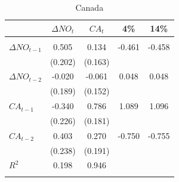 \documentclass[12pt]{article}
\begin{document}
\begin{table}[h!]
\begin{center}
\caption{Canada}			
\begin{threeparttable}

\begin{tabular}{lcccc}
&$ \Delta NO_{t} $        &$ CA_{t} $				 &4\%				&14\% \\
\hline \\[-1.8ex]

$ \Delta NO_{t - 1} $   & 0.505     & 0.134     &-0.461 	&	-0.458	  \\
				                &(0.202)    &(0.163)    &         &           \\
$ \Delta NO_{t - 2} $   &-0.020     &-0.061     & 0.048   &  0.048    \\
				                &(0.189)    &(0.152)    &         &           \\
$ CA_{t - 1} $          &-0.340     & 0.786     & 1.089   &  1.096    \\
				                &(0.226)    &(0.181)    &         &           \\
$ CA_{t - 2} $          & 0.403     & 0.270     &-0.750   & -0.755    \\
				                &(0.238)    &(0.191)    &         &           \\
$ R^{2} $				        & 0.198     & 0.946     &         &           \\
\hline \\[-1.8ex]


\end{tabular}


\end{threeparttable}
\end{center}
\end{table}





\begin{figure}[H]
\caption{}
\end{figure}
\end{document}
